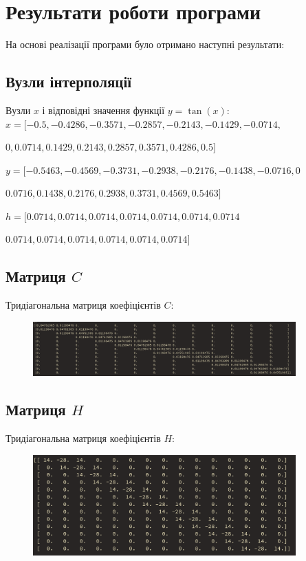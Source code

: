 \documentclass[a4paper, 12pt]{article}
\begin{document}
\newpage
\section{Результати роботи програми}

На основі реалізації програми було отримано наступні результати:

\subsection{Вузли інтерполяції}

Вузли \(x\) і відповідні значення функції \(y = \tan(x)\): \\

\(x =  [ -0.5 , -0.4286 , -0.3571 , -0.2857 , -0.2143 , -0.1429 , -0.0714 , \)

\( 0 , 0.0714 , 0.1429 , 0.2143 , 0.2857 , 0.3571 , 0.4286 , 0.5 ] \)


\(y = [-0.5463 , -0.4569 , -0.3731 , -0.2938 , -0.2176 , -0.1438 , -0.0716 , 0 \)

\(0.0716 , 0.1438 , 0.2176 , 0.2938 , 0.3731 , 0.4569 , 0.5463 ] \)

\(h = [0.0714 , 0.0714 , 0.0714 , 0.0714 , 0.0714 , 0.0714 , 0.0714 \)

\(0.0714 , 0.0714 , 0.0714 , 0.0714 , 0.0714 , 0.0714 ] \)

\subsection{Матриця \(C\)}
Тридіагональна матриця коефіцієнтів \(C\):

\begin{figure}[h!]
    \centering
    \includegraphics[width=0.9\textwidth]{C.png}
    \label{fig:C}
\end{figure}

\subsection{Матриця \(H\)}
Тридіагональна матриця коефіцієнтів \(H\):

\begin{figure}[h!]
    \centering
    \includegraphics[width=0.9\textwidth]{H.png}
    \label{fig:H}
\end{figure}
\end{document}
